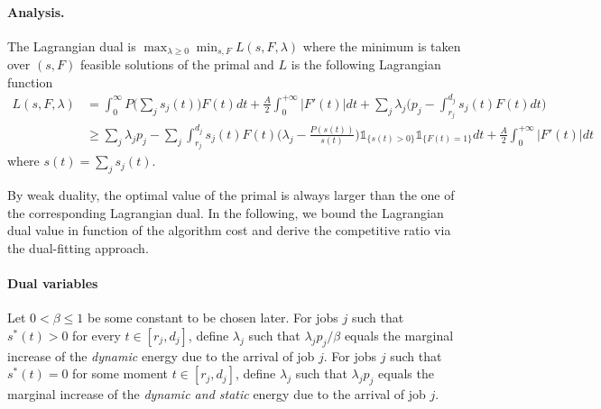 \documentclass[11pt]{article}
\newcommand{\one}{\ensuremath{\mathds{1}}}
\begin{document}
\paragraph{Analysis.} The Lagrangian dual is
$
\max_{\lambda \geq 0} \min_{s,F} L(s,F,\lambda)
$ 
where the minimum is taken over  $(s,F)$ feasible solutions of the primal and 
$L$ is the following Lagrangian function 
\begin{align*}
L(s,F,\lambda) &=
	\int_{0}^{\infty} P\biggl(\sum_{j} s_{j}(t) \biggl)F(t)dt + \frac{A}{2} \int_{0}^{+\infty} |F'(t)|dt
	+ \sum_{j} \lambda_{j} \biggl(p_{j} -  \int_{r_{j}}^{d_{j}} s_{j}(t) F(t)dt \biggl) \\
& \geq \sum_{j} \lambda_{j}p_{j} 
	- \sum_{j}  \int_{r_{j}}^{d_{j}} s_{j}(t) F(t) \biggl( \lambda_{j} - \frac{{P}(s(t))}{s(t)}\biggl) 
		\one_{\{s(t) > 0\}}  \one_{\{F(t) = 1\}}dt + \frac{A}{2} \int_{0}^{+\infty} |F'(t)|dt
\end{align*}
where $s(t) = \sum_{j} s_{j}(t)$. 

By weak duality, the optimal value of the primal is always larger than the one of the 
corresponding Lagrangian dual. In the following, we bound the Lagrangian dual value
in function of the algorithm cost and derive the competitive 
ratio via the dual-fitting approach.


\paragraph{Dual variables} Let $0 < \beta \leq 1$ be 
some constant to be chosen later. For jobs $j$ such that 
$s^{*}(t) > 0$ for every $t \in [r_{j},d_{j}]$,
define $\lambda_{j}$ such that $\lambda_{j}p_{j}/\beta$ equals the marginal 
increase of the \emph{dynamic} energy due to the arrival of job $j$. For jobs $j$ such that 
$s^{*}(t) = 0$ for some moment $t \in [r_{j},d_{j}]$,
define $\lambda_{j}$ such that $\lambda_{j}p_{j}$ equals the marginal 
increase of the \emph{dynamic and static} energy due to the arrival of job $j$.
\end{document}
